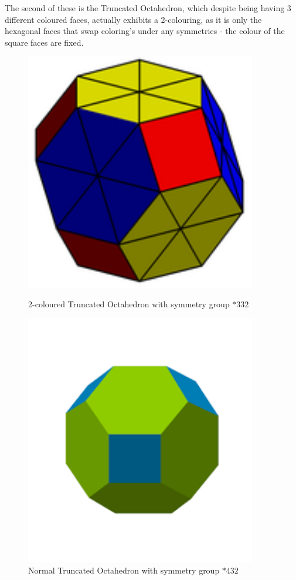 \documentclass{article}
\begin{document}
The second of these is the Truncated Octahedron, which despite being having 3 different coloured faces, actually exhibits a 2-colouring, as it is only the hexagonal faces that swap coloring's under any symmetries - the colour of the square faces are fixed.

\begin{figure}[htbp]
    \centering
    \begin{minipage}{0.3\textwidth}
        \centering
        \includegraphics[width=0.9\textwidth]{Truncated Octahedron.png} 
        \caption{2-coloured Truncated Octahedron with symmetry group $*332$}
        
    \end{minipage}\hfill
    \begin{minipage}{0.3\textwidth}
        \centering
        \includegraphics[width=0.9\textwidth]{Norm Truncated .png} 
        \caption{Normal Truncated Octahedron with symmetry group $*432$}
        

\end{minipage}
\end{figure}
\end{document}
